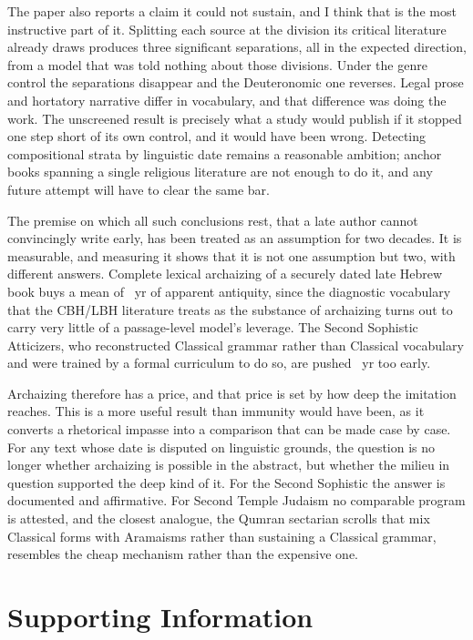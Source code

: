 \documentclass[10pt,letterpaper]{article}
\newcommand{\cbh}{CBH}
\newcommand{\lbh}{LBH}
\begin{document}
The paper also reports a claim it could not sustain, and I think that is the
most instructive part of it.  Splitting each source at the division its critical
literature already draws produces three significant separations, all in the
expected direction, from a model that was told nothing about those divisions.
Under the genre control the separations disappear and the Deuteronomic one
reverses.  Legal prose and hortatory narrative differ in vocabulary, and that
difference was doing the work.  The unscreened result is precisely what a study
would publish if it stopped one step short of its own control, and it would have
been wrong.  Detecting compositional strata by linguistic date remains a
reasonable ambition; \HBbooks{} anchor books spanning a single religious
literature are not enough to do it, and any future attempt will have to clear
the same bar.

The premise on which all such conclusions rest, that a late author cannot
convincingly write early, has been treated as an assumption for two decades.  It
is measurable, and measuring it shows that it is not one assumption but two,
with different answers.  Complete lexical archaizing of a securely dated late
Hebrew book buys a mean of \arcMeanAbs~yr of apparent antiquity, since the
diagnostic vocabulary that the \cbh{}/\lbh{} literature treats as the substance
of archaizing turns out to carry very little of a passage-level model's
leverage.  The Second Sophistic Atticizers, who reconstructed Classical grammar
rather than Classical vocabulary and were trained by a formal curriculum to do
so, are pushed \GKattshiftAbs~yr too early.

Archaizing therefore has a price, and that price is set by how deep the
imitation reaches.  This is a more useful result than immunity would have been,
as it converts a rhetorical impasse into a comparison that can be made case by
case.  For any text whose date is disputed on linguistic grounds, the question is
no longer whether archaizing is possible in the abstract, but whether the milieu
in question supported the deep kind of it.  For the Second Sophistic the answer
is documented and affirmative.  For Second Temple Judaism no comparable program
is attested, and the closest analogue, the Qumran sectarian scrolls that mix
Classical forms with Aramaisms rather than sustaining a Classical grammar,
resembles the cheap mechanism rather than the expensive one.

\section*{Supporting Information}
\end{document}
